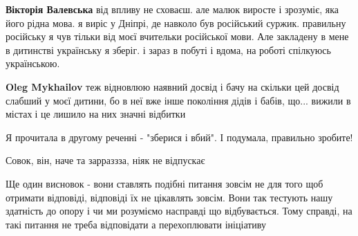 \begin{itemize}
\begin{itemize}
 
\textbf{Вікторія Валевська} від впливу не сховаєш. але малюк виросте і зрозуміє, яка його рідна мова. я виріс у Дніпрі, де навколо був російський суржик. правильну російську я чув тільки від моєї вчительки російської мови. Але закладену в мене в дитинстві українську я зберіг. і зараз в побуті і вдома, на роботі спілкуюсь українською.

 
\textbf{Oleg Mykhailov} теж відновлюю наявний досвід і бачу на скільки цей досвід слабший у моєї дитини, бо в неї вже інше покоління дідів і бабів, що... вижили в містах🤔і це лишило на них значні відбитки🤦
\end{itemize}

 
Я прочитала в другому реченні - "зберися і вбий". І подумала, правильно зробите!

 
Совок, він, наче та зарраззза, ніяк не відпускає

 

Ще один висновок - вони ставлять подібні питання зовсім не для того щоб
отримати відповіді, відповіді їх не цікавлять зовсім. Вони так тестують нашу
здатність до опору і чи ми розуміємо насправді що відбувається. Тому справді,
на такі питання не треба відповідати а перехоплювати ініціативу


\end{itemize}
